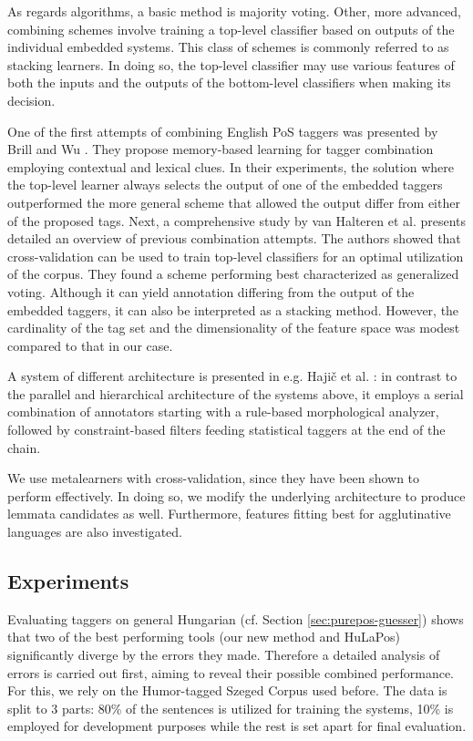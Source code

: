 As regards algorithms, a basic method is majority voting.
Other, more advanced, combining schemes involve training a top-level classifier based on outputs of the individual embedded systems.
This class of schemes is commonly referred to as stacking learners.
In doing so, the top-level classifier may use various features of both the inputs and the outputs of the bottom-level classifiers when making its decision. 

One of the first attempts of combining English PoS taggers was presented by Brill and Wu \cite{Brill1998}.
They propose memory-based learning for tagger combination employing contextual and lexical clues.
In their experiments, the solution where the top-level learner always selects the output of one of the embedded taggers outperformed the more general scheme that allowed the output differ from either of the proposed tags.
Next, a comprehensive study by van Halteren et al. \cite{Halteren2001} presents detailed an overview of previous combination attempts.
The authors showed that cross-validation can be used to train top-level classifiers for an optimal utilization of the corpus.
They found a scheme performing best characterized as generalized voting.
Although it can yield annotation differing from the output of the embedded taggers, it can also be interpreted as a stacking method.
However, the cardinality of the tag set and the dimensionality of the feature space was modest compared to that in our case.

A system of different architecture is presented in e.g.
Hajič et al. \cite{Hajic2001}: in contrast to the parallel and hierarchical architecture of the systems above, it employs a serial combination of annotators starting with a rule-based morphological analyzer, followed by constraint-based filters feeding statistical taggers at the end of the chain. 

We use metalearners with cross-validation, since they have been shown \cite{Brill1998,Halteren2001} to perform effectively.
In doing so, we modify the underlying architecture to produce lemmata candidates as well.
Furthermore, features fitting best for agglutinative languages are also investigated.

\subsection{Experiments}

Evaluating taggers on general Hungarian (cf. Section \ref{sec:purepos-guesser}) shows that two of the best performing tools (our new method and HuLaPos) significantly diverge by the errors they made.
Therefore a detailed analysis of errors is carried out first, aiming to reveal their possible combined performance.
For this, we rely on the Humor-tagged Szeged Corpus used before.
The data is split to 3 parts: 80\% of the sentences is utilized for training the systems, 10\% is employed for development purposes while the rest is set apart for final evaluation.


